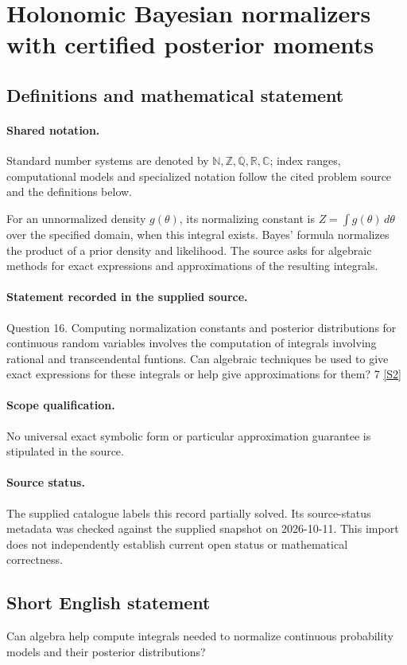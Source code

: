 \documentclass[11pt]{article}
\newcommand{\sref}[2]{\hyperlink{source:#1:#2}{[S#2]}}
\begin{document}
\section{Holonomic Bayesian normalizers with certified posterior moments}\label{statement}

\subsection{Definitions and mathematical statement}

\paragraph{Shared notation.}Standard number systems are denoted by $\mathbb N,\mathbb Z,\mathbb Q,\mathbb R,\mathbb C$; index ranges, computational models and specialized notation follow the cited problem source and the definitions below.


For an unnormalized density $g(\theta)$, its normalizing constant is $Z=\int g(\theta)\,d\theta$ over the specified domain, when this integral exists. Bayes' formula normalizes the product of a prior density and likelihood. The source asks for algebraic methods for exact expressions and approximations of the resulting integrals.
\paragraph{Statement recorded in the supplied source.}
Question 16. Computing normalization constants and posterior distributions for continuous random variables involves the computation of integrals involving rational and transcendental funtions. Can algebraic techniques be used to give exact expressions for these integrals or help give approximations for them? 7 \sref{statement}{2}
\paragraph{Scope qualification.}
No universal exact symbolic form or particular approximation guarantee is stipulated in the source.
\paragraph{Source status.}
The supplied catalogue labels this record partially solved. Its source-status metadata was checked against the supplied snapshot on 2026-10-11. This import does not independently establish current open status or mathematical correctness.
\subsection{Short English statement}
Can algebra help compute integrals needed to normalize continuous probability models and their posterior distributions?
\end{document}
